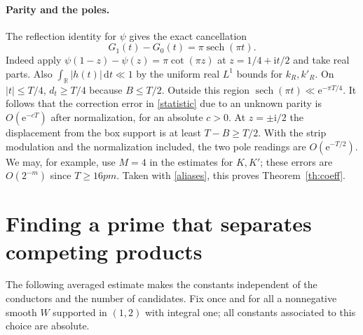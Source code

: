 \documentclass[11pt]{article}
\newcommand{\R}{\mathbb R}
\newcommand{\ee}{\mathrm e}
\newcommand{\ii}{\mathrm i}
\newcommand{\dd}{\,\mathrm d}
\newcommand{\sech}{\operatorname{sech}}
\begin{document}
\paragraph{Parity and the poles.}
The reflection identity for $\psi$ gives the exact cancellation
\begin{equation}\label{parity}
 G_1(t)-G_0(t)=\pi\sech(\pi t).
\end{equation}
Indeed apply $\psi(1-z)-\psi(z)=\pi\cot(\pi z)$ at $z=1/4+\ii t/2$ and take real parts. Also $\int_{\R}|h(t)|\dd t\ll1$ by the uniform real $L^1$ bounds for $k_R,k'_R$. On $|t|\le T/4$, $d_t\ge T/4$ because $B\le T/2$. Outside this region $\sech(\pi t)\ll\ee^{-\pi T/4}$. It follows that the correction error in \eqref{statistic} due to an unknown parity is $O(\ee^{-cT})$ after normalization, for an absolute $c>0$. At $z=\pm\ii/2$ the displacement from the box support is at least $T-B\ge T/2$. With the strip modulation and the normalization included, the two pole readings are $O(\ee^{-T/2})$. We may, for example, use $M=4$ in the estimates for $K,K'$; these errors are $O(2^{-m})$ since $T\ge 16pm$. Taken with \eqref{aliases}, this proves Theorem~\ref{th:coeff}.

\section{Finding a prime that separates competing products}
The following averaged estimate makes the constants independent of the conductors and the number of candidates. Fix once and for all a nonnegative smooth $W$ supported in $(1,2)$ with integral one; all constants associated to this choice are absolute.
\end{document}
